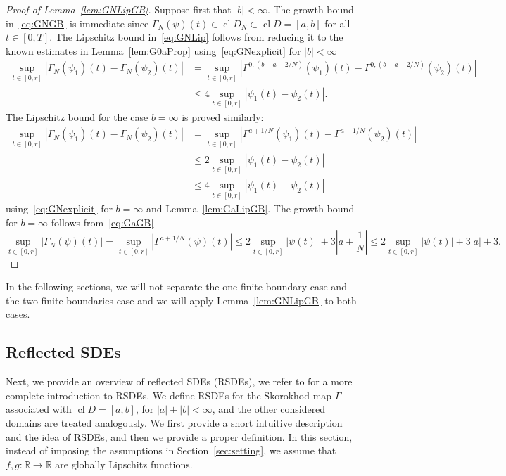 \documentclass[11pt]{amsart}
\newcommand{\CDD}{\operatorname{cl} D}
\newcommand{\CDDN}{\operatorname{cl} D_{N}}
\begin{document}
{\begin{proof}[Proof of Lemma~\ref{lem:GNLipGB}]
Suppose first that $|b|<\infty$. The growth bound in~\eqref{eq:GNGB} is immediate since $\Gamma_{N}(\psi)(t) \in \CDDN \subset \CDD = [a,b]$ for all $t \in [0,T]$. The Lipschitz bound in~\eqref{eq:GNLip} follows from reducing it to the known estimates in Lemma~\ref{lem:G0aProp} using~\eqref{eq:GNexplicit} for $|b|<\infty$
\begin{align*}
\sup_{t \in [0,r]} |\Gamma_{N}(\psi_{1})(t)-\Gamma_{N}(\psi_{2})(t)| &= \sup_{t \in [0,r]} |\Gamma^{0,(b-a-2/N)}(\psi_{1})(t)-\Gamma^{0,(b-a-2/N)}(\psi_{2})(t)| \\ &\leq 4 \sup_{t \in [0,r]} |\psi_{1}(t)-\psi_{2}(t)|.
\end{align*}
The Lipschitz bound for the case $b=\infty$ is proved similarly:
\begin{align*}
\sup_{t \in [0,r]} |\Gamma_{N}(\psi_{1})(t)-\Gamma_{N}(\psi_{2})(t)| &= \sup_{t \in [0,r]} |\Gamma^{a + 1/N}(\psi_{1})(t)-\Gamma^{a + 1/N}(\psi_{2})(t)| \\ &\leq 2 \sup_{t \in [0,r]} |\psi_{1}(t)-\psi_{2}(t)| \\ &\leq 4 \sup_{t \in [0,r]} |\psi_{1}(t)-\psi_{2}(t)|
\end{align*}
using~\eqref{eq:GNexplicit} for $b=\infty$ and Lemma~\ref{lem:GaLipGB}. The growth bound for $b = \infty$ follows from~\eqref{eq:GaGB}
\begin{equation*}
\sup_{t \in [0,r]} |\Gamma_{N}(\psi)(t)| = \sup_{t \in [0,r]} |\Gamma^{a + 1/N}(\psi)(t)| \leq 2 \sup_{t \in [0,r]} |\psi(t)| + 3 \left|a + \frac{1}{N} \right| \leq 2 \sup_{t \in [0,r]} |\psi(t)| + 3 |a| + 3.
\end{equation*}
\end{proof}
In the following sections, we will not separate the one-finite-boundary case and the two-finite-boundaries case and we will apply Lemma~\ref{lem:GNLipGB} to both cases.

\subsection{Reflected SDEs}\label{sec:RSDE}
Next, we provide an overview of reflected SDEs (RSDEs), we refer to \cite{Pilipenko2014AnIT} for a more complete introduction to RSDEs. We define RSDEs for the Skorokhod map $\Gamma$ associated with $\CDD = [a,b]$, for $|a|+|b|<\infty$, and the other considered domains are treated analogously. We first provide a short intuitive description and the idea of RSDEs, and then we provide a proper definition. In this section, instead of imposing the assumptions in Section~\ref{sec:setting}, we assume that $f,g: \mathbb{R} \to \mathbb{R}$ are globally Lipschitz functions.

}
\end{document}

